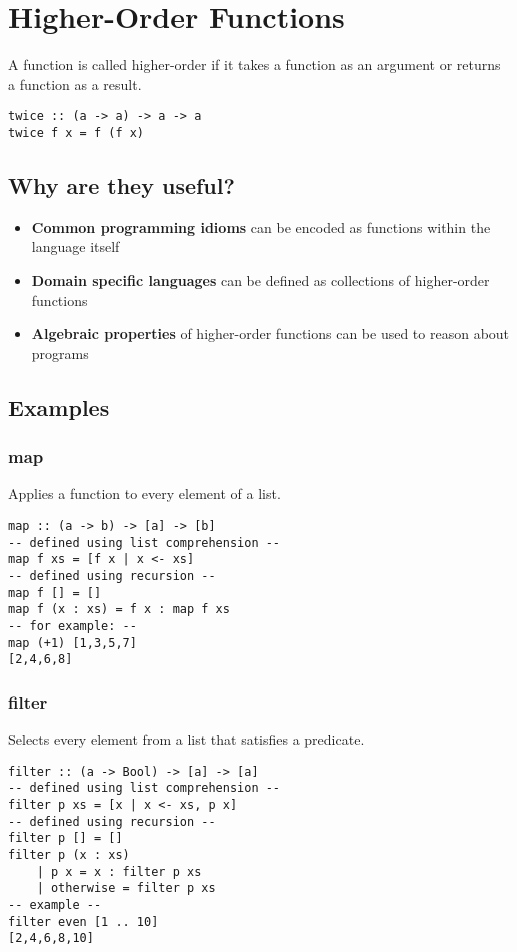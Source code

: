 
\section{Higher-Order Functions}
A function is called higher-order if it takes a function as an argument or returns a function as a result.
\begin{lstlisting}
twice :: (a -> a) -> a -> a
twice f x = f (f x)
\end{lstlisting}

\subsection{Why are they useful?}
\begin{itemize}
    \item \textbf{Common programming idioms} can be encoded as functions within the language itself
    \item \textbf{Domain specific languages} can be defined as collections of higher-order functions
    \item \textbf{Algebraic properties} of higher-order functions can be used to reason about programs
\end{itemize}

\subsection{Examples}
\subsubsection{map}
Applies a function to every element of a list.
\begin{lstlisting}
map :: (a -> b) -> [a] -> [b]
-- defined using list comprehension --
map f xs = [f x | x <- xs]
-- defined using recursion --
map f [] = []
map f (x : xs) = f x : map f xs
-- for example: --
map (+1) [1,3,5,7]
[2,4,6,8]
\end{lstlisting}

\subsubsection{filter}
Selects every element from a list that satisfies a predicate.
\begin{lstlisting}
filter :: (a -> Bool) -> [a] -> [a]
-- defined using list comprehension --
filter p xs = [x | x <- xs, p x]
-- defined using recursion --
filter p [] = []
filter p (x : xs)
    | p x = x : filter p xs
    | otherwise = filter p xs
-- example --
filter even [1 .. 10]
[2,4,6,8,10]
\end{lstlisting}

